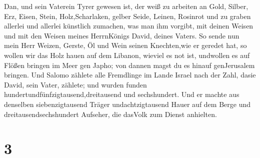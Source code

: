 Dan, und sein Vaterein Tyrer gewesen ist, der weiß zu arbeiten an Gold,
Silber, Erz, Eisen, Stein, Holz,Scharlaken, gelber Seide, Leinen,
Rosinrot und zu graben allerlei und allerlei künstlich zumachen, was man
ihm vorgibt, mit deinen Weisen und mit den Weisen meines HerrnKönigs
David, deines Vaters.  So sende nun mein Herr Weizen,
Gerste, Öl und Wein seinen Knechten,wie er geredet hat,  so
wollen wir das Holz hauen auf dem Libanon, wieviel es not ist, undwollen
es auf Flößen bringen im Meer gen Japho; von dannen magst du es hinauf
genJerusalem bringen.  Und Salomo zählete alle Fremdlinge
im Lande Israel nach der Zahl, dasie David, sein Vater, zählete; und
wurden funden hundertundfünfzigtausend,dreitausend und sechshundert.
 Und er machte aus denselben siebenzigtausend Träger
undachtzigtausend Hauer auf dem Berge und dreitausendsechshundert
Aufseher, die dasVolk zum Dienst anhielten.

\hypertarget{section-2}{%
\section{3}\label{section-2}}

